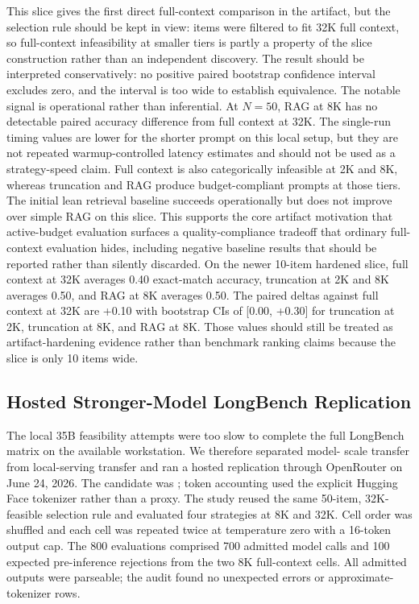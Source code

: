 \documentclass[11pt]{article}
\begin{document}
This slice gives the first direct full-context comparison in the artifact, but
the selection rule should be kept in view: items were filtered to fit 32K full
context, so full-context infeasibility at smaller tiers is partly a property of
the slice construction rather than an independent discovery.
The result should be interpreted conservatively: no positive paired bootstrap
confidence interval excludes zero, and the interval is too wide to establish
equivalence.  The notable signal is operational rather than inferential.  At
$N=50$, RAG at 8K has no detectable paired accuracy difference from full
context at 32K.  The single-run timing values are lower for the shorter prompt
on this local setup, but they are not repeated warmup-controlled latency
estimates and should not be used as a strategy-speed claim.  Full context is also
categorically infeasible at 2K and 8K, whereas truncation and RAG produce
budget-compliant prompts at those tiers.  The initial lean retrieval baseline
succeeds operationally but does not improve over simple RAG on this slice.
This supports the core artifact motivation that active-budget evaluation
surfaces a
quality-compliance tradeoff that ordinary full-context evaluation
hides, including negative baseline results that should be reported rather than
silently discarded.  On the newer 10-item hardened slice, full context at 32K
averages 0.40 exact-match accuracy, truncation at 2K and 8K averages 0.50,
and RAG at 8K averages 0.50.  The paired deltas against full context at 32K
are +0.10 with bootstrap CIs of [0.00, +0.30] for truncation at 2K,
truncation at 8K, and RAG at 8K.  Those values should still be treated as
artifact-hardening evidence rather than benchmark ranking claims because the
slice is only 10 items wide.

\subsection{Hosted Stronger-Model LongBench Replication}

The local 35B feasibility attempts were too slow to complete the full
LongBench matrix on the available workstation.  We therefore separated model-
scale transfer from local-serving transfer and ran a hosted replication through
OpenRouter on June 24, 2026.  The candidate was
; token accounting used the explicit
 Hugging Face tokenizer rather than a
proxy.  The study reused the same 50-item, 32K-feasible selection rule and
evaluated four strategies at 8K and 32K.  Cell order was shuffled and each cell
was repeated twice at temperature zero with a 16-token output cap.  The 800
evaluations comprised 700 admitted model calls and 100 expected pre-inference
rejections from the two 8K full-context cells.  All admitted outputs were
parseable; the audit found no unexpected errors or approximate-tokenizer rows.
\end{document}
